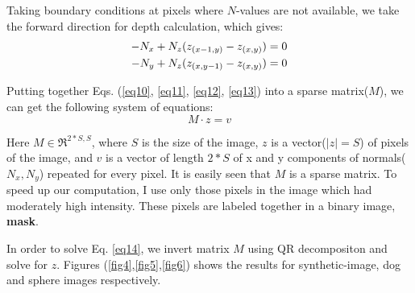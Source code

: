 \documentclass[11pt]{article}
\begin{document}
 \vspace{-10pt}
 Taking boundary conditions at pixels where $N$-values are not available, we take the forward direction for depth calculation, which gives:
  \vspace{-10pt}
 \begin{align}
  -N_x + N_z(z_{(x-1,y)} - z_{(x,y)}) &= 0 \label{eq12} \\
  -N_y + N_z(z_{(x,y-1)} - z_{(x,y)}) &= 0 \label{eq13} 
  \vspace{-10pt}
 \end{align}
 
 Putting together Eqs. (\ref{eq10}, \ref{eq11}, \ref{eq12}, \ref{eq13}) into a sparse matrix($M$), we can get the following system of equations:
 \vspace{-5pt}
 \begin{equation}
   M \cdot z = v 
   \label{eq14}
 \end{equation}

Here $M \in \Re^{2*S,S}$, where $S$ is the size of the image, $z$ is a vector($|z| = S$) of pixels of the image, and $v$ is a vector of length $2*S$ of x and y components of normals($N_x, N_y$) repeated for every pixel. It is easily seen that $M$ is a sparse matrix. To speed up our computation, I use only those pixels in the image which had moderately high intensity. These pixels are labeled together in a binary image, \textbf{mask}.

In order to solve Eq. \ref{eq14}, we invert matrix $M$ using QR decompositon and solve for $z$.  Figures (\ref{fig4},\ref{fig5},\ref{fig6}) shows the results for synthetic-image, dog and sphere images respectively.
\end{document}
